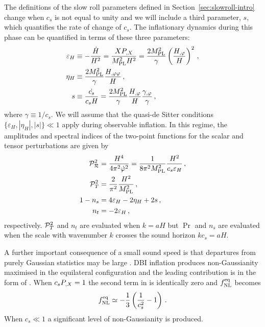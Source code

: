 The definitions of the slow roll parameters defined in
Section~\ref{sec:slowroll-intro} 
change when $c_s$ is not equal to unity and we
will include a third parameter, $s$, which quantifies the rate of change of $c_s$.
The inflationary dynamics during this phase can  
be quantified in terms of these three parameters: 
% 
\begin{align}
\label{eq:epsdefn-dbiintro}
\varepsilon_H &\equiv -\frac{\dot{H}}{H^2}
= \frac{XP_{,X}}{M_{\mathrm{PL}}^2H^2} 
= \frac{2M_{\mathrm{PL}}^2}{\gamma} \left( \frac{H_{,\varphi}}{H} \right)^2 \,,\\
\label{eq:defeta-dbiintro}
\eta_H &\equiv  \frac{2M_{\mathrm{PL}}^2}{\gamma}\frac{H_{,\varphi\varphi}}{H} \,,\\
\label{eq:defs-dbiintro}
s &\equiv \frac{\dot{c_s}}{c_sH} 
= \frac{2M_{\mathrm{PL}}^2}{\gamma} \frac{H_{,\varphi}}{H}\frac{\gamma_{,\varphi}}{\gamma}  \,,
\end{align}
% 
where $\gamma \equiv 1/c_s$. 
We will assume that the quasi-de Sitter conditions 
$\{ \varepsilon_H, |\eta_H | , |s | \}  \ll 1$ apply during observable inflation. 
In this regime, the amplitudes and spectral indices of the two-point functions 
for the scalar and tensor perturbations are given by \cite{gm}
% 
\begin{align}
\label{eq:spectra-dbiintro}
\mathcal{P}_{\mathcal{R}}^2  &= \frac{H^4}{4\pi^2\dot{\varphi}^2} =\frac{1}{8 \pi^2 M_{\mathrm{PL}}^2}
\frac{H^2}{c_s \varepsilon_H}\,,
\\
\mathcal{P}_T^2 &= \frac{2}{\pi^2} \frac{H^2}{M_{\mathrm{PL}}^2} \,,
\\
\label{indices}
1-n_s &= 4 \varepsilon_H -2\eta_H  +2s \,,
\\
 n_t &= -2\varepsilon_H  \,,
\end{align}
% 
respectively. $\mathcal{P}_T^2$ and $n_t$ are evaluated when $k=aH$ but $\Pr$ and $n_s$ are
evaluated 
when the scale with wavenumber $k$ crosses 
the sound horizon $k c_s = aH$.  



A further important consequence of a small sound speed is that departures  
from purely Gaussian statistics may be large 
\cite{brane6,brane11,lidser3,chenetal}. 
DBI inflation produces non-Gaussianity maximised in the equilateral
configuration and the leading contribution is in the form of
. 
When $c_sP_{,X}=1$ the second term in 
 is identically zero and $f_{\mathrm{NL}}^{\mathrm{eq}}$ becomes
\cite{chenetal,lidser2}
% 
\begin{equation}
\label{eq:fnlcs-dbiintro}
f_{\mathrm{NL}}^{\mathrm{eq}} \simeq -\frac{1}{3} \left( \frac{1}{c_s^2} -1 \right) \,.
\end{equation}
% 
When $c_s\ll1$ a significant level of non-Gaussianity is produced.

